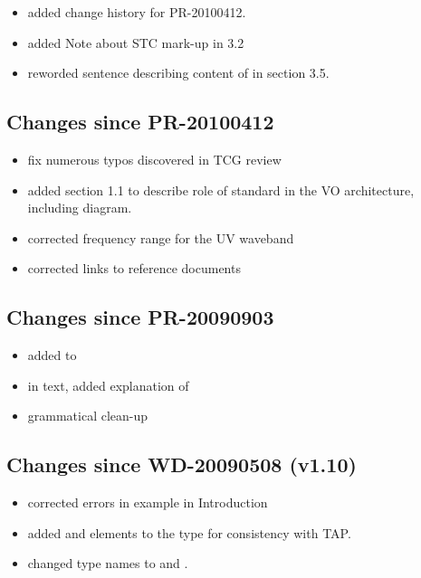 \documentclass[11pt,a4paper]{ivoa}
\begin{document}
\begin{itemize}
  \item added change history for PR-20100412.
  \item added Note about STC mark-up in 3.2
  \item reworded sentence describing content of  in
       section 3.5.
\end{itemize}

\subsection{Changes since PR-20100412}

\begin{itemize}
  \item fix numerous typos discovered in TCG review
  \item added section 1.1 to describe role of standard in the VO
       architecture, including diagram.
  \item corrected frequency range for the UV waveband
  \item corrected links to reference documents
\end{itemize}

\subsection{Changes since PR-20090903}

\begin{itemize}
  \item added 
       to 
  \item in text, added explanation of
  \item grammatical clean-up
\end{itemize}

\subsection{Changes since WD-20090508 (v1.10)}

\begin{itemize}
  \item corrected errors in example in Introduction
  \item added  and
        elements to the
        type for consistency with TAP.
  \item changed type names  to
        and 
       .
\end{itemize}


\end{document}
